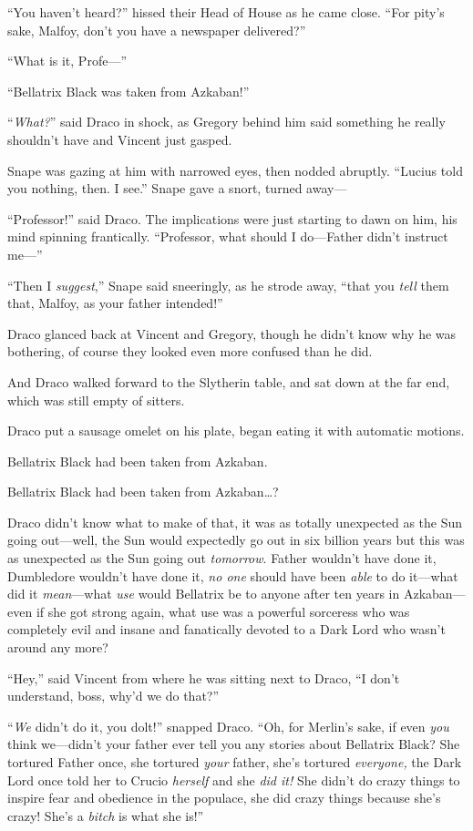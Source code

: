 “You haven’t heard?” hissed their Head of House as he came close. “For pity’s sake, Malfoy, don’t you have a newspaper delivered?”

“What is it, Profe—”

“Bellatrix Black was taken from Azkaban!”

“\emph{What?}” said Draco in shock, as Gregory behind him said something he really shouldn’t have and Vincent just gasped.

Snape was gazing at him with narrowed eyes, then nodded abruptly. “Lucius told you nothing, then. I see.” Snape gave a snort, turned away—

“Professor!” said Draco. The implications were just starting to dawn on him, his mind spinning frantically. “Professor, what should I do—Father didn’t instruct me—”

“Then I \emph{suggest},” Snape said sneeringly, as he strode away, “that you \emph{tell} them that, Malfoy, as your father intended!”

Draco glanced back at Vincent and Gregory, though he didn’t know why he was bothering, of course they looked even more confused than he did.

And Draco walked forward to the Slytherin table, and sat down at the far end, which was still empty of sitters.

Draco put a sausage omelet on his plate, began eating it with automatic motions.

Bellatrix Black had been taken from Azkaban.

Bellatrix Black had been taken from Azkaban…?

Draco didn’t know what to make of that, it was as totally unexpected as the Sun going out—well, the Sun would expectedly go out in six billion years but this was as unexpected as the Sun going out \emph{tomorrow}. Father wouldn’t have done it, Dumbledore wouldn’t have done it, \emph{no one} should have been \emph{able} to do it—what did it \emph{mean}—what \emph{use} would Bellatrix be to anyone after ten years in Azkaban—even if she got strong again, what use was a powerful sorceress who was completely evil and insane and fanatically devoted to a Dark Lord who wasn’t around any more?

“Hey,” said Vincent from where he was sitting next to Draco, “I don’t understand, boss, why’d we do that?”

“\emph{We} didn’t do it, you dolt!” snapped Draco. “Oh, for Merlin’s sake, if even \emph{you} think we—didn’t your father ever tell you any stories about Bellatrix Black? She tortured Father once, she tortured \emph{your} father, she’s tortured \emph{everyone,} the Dark Lord once told her to Crucio \emph{herself} and she \emph{did it!} She didn’t do crazy things to inspire fear and obedience in the populace, she did crazy things because she’s crazy! She’s a \emph{bitch} is what she is!”

